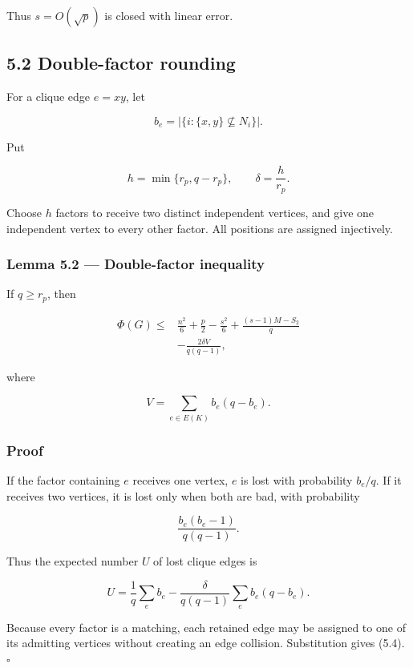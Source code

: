 \documentclass[11pt,a4paper]{article}
\begin{document}
Thus \(s=O(\sqrt p)\) is closed with linear error.

\subsection{5.2 Double-factor rounding}\label{double-factor-rounding}

For a clique edge \(e=xy\), let

\[
b_e=|\{i:\{x,y\}\not\subseteq N_i\}|.
\]

Put

\[
h=\min\{r_p,q-r_p\},
\qquad
\delta=\frac h{r_p}.
\]

Choose \(h\) factors to receive two distinct independent vertices, and give one independent vertex to every other factor. All positions are assigned injectively.

\subsubsection{Lemma 5.2 --- Double-factor inequality}\label{lemma-5.2-double-factor-inequality}

If \(q\ge r_p\), then

\[
\boxed{
\begin{aligned}
\Phi(G)
\le{}&
\frac{n^2}{6}+\frac p2-\frac{s^2}{6}
+
\frac{(s-1)M-S_2}{q}\\
&-
\frac{2\delta V}{q(q-1)},
\end{aligned}
}
\tag{5.4}
\]

where

\[
V=\sum_{e\in E(K)}b_e(q-b_e).
\tag{5.5}
\]

\subsubsection{Proof}\label{proof-4}

If the factor containing \(e\) receives one vertex, \(e\) is lost with probability \(b_e/q\). If it receives two vertices, it is lost only when both are bad, with probability

\[
\frac{b_e(b_e-1)}{q(q-1)}.
\]

Thus the expected number \(U\) of lost clique edges is

\[
U
=
\frac1q\sum_e b_e
-
\frac{\delta}{q(q-1)}\sum_e b_e(q-b_e).
\]

Because every factor is a matching, each retained edge may be assigned to one of its admitting vertices without creating an edge collision. Substitution gives (5.4). \(\square\)
\end{document}
